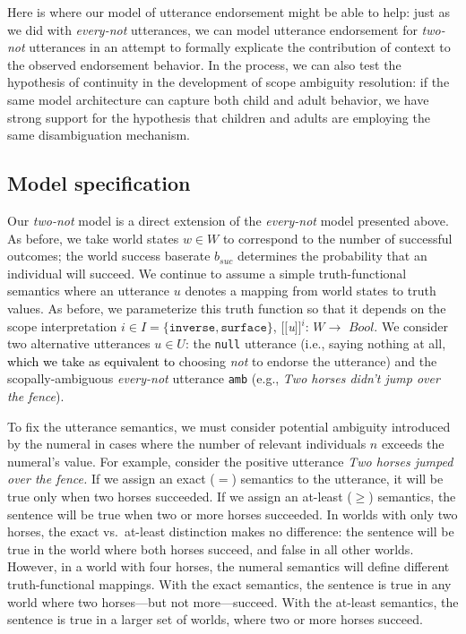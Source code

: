\documentclass[cm]{glossa}
\newcommand{\sem}[1]{\mbox{$[\![$#1$]\!]$}}
\newcommand{\lp}[1]{\textcolor{black}{#1}} %
\begin{document}
Here is where our model of utterance endorsement might be able to help: just as we did with \emph{every-not} utterances, we can model utterance endorsement for \emph{two-not} utterances in an attempt to formally explicate the contribution of context to the observed endorsement behavior. In the process, we can also test the hypothesis of continuity in the development of scope ambiguity resolution: if the same model architecture can capture both child and adult behavior, we have strong support for the hypothesis that children and adults are employing the same disambiguation mechanism.


\subsection{Model specification} \label{two-model-specification}

Our \emph{two-not} model is a direct extension of the \emph{every-not} model presented above. As before, we take world states $w\in W$ to correspond to the number of successful outcomes; the world success baserate $b_{suc}$ determines the probability that an individual will succeed. We continue to assume a simple truth-functional semantics where an utterance $u$ denotes a mapping from world states to truth values. As before, we parameterize this truth function so that it depends on the scope interpretation $i \in I = \{\texttt{inverse}, \texttt{surface}\}$, \sem{\textit{u}}$^{i}$: $W\rightarrow$ $Bool$. We consider two alternative utterances $u \in U$: the \texttt{null} utterance (i.e., saying nothing at all, \lp{which we take as equivalent to} choosing \emph{not} to endorse the utterance) and the scopally-ambiguous \emph{every-not} utterance \texttt{amb} (e.g., \textit{Two horses didn't jump over the fence}).  

To fix the utterance semantics, we must consider potential ambiguity introduced by the numeral in cases where the number of relevant individuals $n$ exceeds the numeral's value. For example, consider the positive utterance \textit{Two horses jumped over the fence.} If we assign an {exact} ($=$) semantics to the utterance, it will be true only when two horses succeeded. If we assign an {at-least} ($\geq$) semantics, the sentence will be true when two or more horses succeeded. In worlds with only two horses, the exact vs.~at-least distinction makes no difference: the sentence will be true in the world where both horses succeed, and false in all other worlds. However, in a world with four horses, the numeral semantics will define different truth-functional mappings. With the exact semantics, the sentence is true in any world where two horses---but not more---succeed. With the at-least semantics, the sentence is true in a larger set of worlds,  where two or more horses succeed. 
\end{document}
